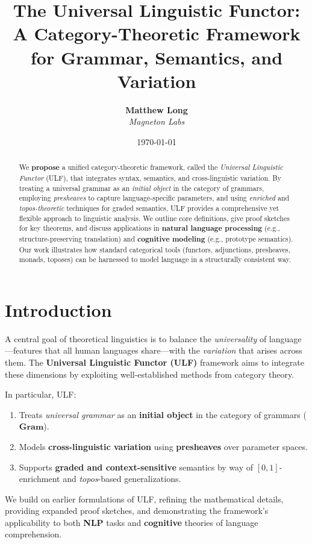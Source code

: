 \documentclass[12pt]{article}
\title{\textbf{The Universal Linguistic Functor:\\
A Category-Theoretic Framework for Grammar, Semantics, and Variation}}
\author{\textbf{Matthew Long}\\
\textit{Magneton Labs}}
\date{\today}
\theoremstyle{plain}
\theoremstyle{definition}
\begin{document}
\maketitle

\begin{abstract}
We \textbf{propose} a unified category-theoretic framework, called the \emph{Universal Linguistic Functor} (ULF), that integrates syntax, semantics, and cross-linguistic variation. By treating a universal grammar as an \emph{initial object} in the category of grammars, employing \emph{presheaves} to capture language-specific parameters, and using \emph{enriched} and \emph{topos-theoretic} techniques for graded semantics, ULF provides a comprehensive yet flexible approach to linguistic analysis. We outline core definitions, give proof sketches for key theorems, and discuss applications in \textbf{natural language processing} (e.g., structure-preserving translation) and \textbf{cognitive modeling} (e.g., prototype semantics). Our work illustrates how standard categorical tools (functors, adjunctions, presheaves, monads, toposes) can be harnessed to model language in a structurally consistent way.
\end{abstract}

\tableofcontents

\section{Introduction}\label{sec:intro}
A central goal of theoretical linguistics is to balance the \emph{universality} of language---features that all human languages share---with the \emph{variation} that arises across them. The \textbf{Universal Linguistic Functor (ULF)} framework aims to integrate these dimensions by exploiting well-established methods from category theory.

In particular, ULF:
\begin{enumerate}
    \item Treats \emph{universal grammar} as an \textbf{initial object} in the category of grammars (\(\mathbf{Gram}\)).
    \item Models \textbf{cross-linguistic variation} using \textbf{presheaves} over parameter spaces.
    \item Supports \textbf{graded and context-sensitive} semantics by way of \([0,1]\)-enrichment and \emph{topos}-based generalizations.
\end{enumerate}

We build on earlier formulations of ULF, refining the mathematical details, providing expanded proof sketches, and demonstrating the framework's applicability to both \textbf{NLP} tasks and \textbf{cognitive} theories of language comprehension.
\end{document}
